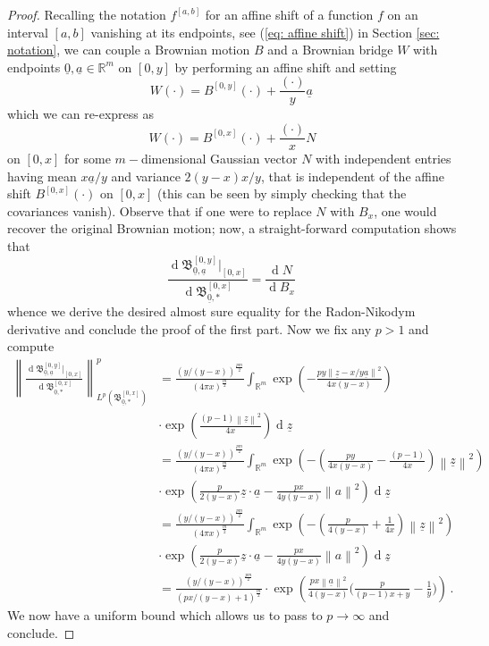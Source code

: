 \documentclass[11pt, reqno]{amsart}
\numberwithin{equation}{section}
\newcommand{\R}{\ensuremath{\mathbb{R}}}
\newcommand{\norm}[1]{\left\lVert#1\right\rVert}
\newcommand{\diff}{\ensuremath{\operatorname{d}\!}}
\begin{document}
\begin{proof}
    Recalling the notation $f^{[a,b]}$  for an affine shift of a function $f$ on an interval $[a,b]$ vanishing at its endpoints, see (\ref{eq: affine shift}) in Section \ref{sec: notation}, we can couple a Brownian motion $B$  and a Brownian bridge $W$ with endpoints $\underline{0}, \underline{a}\in \R^m$ on $[0,y]$ by performing an affine shift and setting
    $$
    W(\cdot) = B^{[0, y]}(\cdot)+\frac{(\cdot)}{y}\underline{a}\,
    $$
    which we can re-express as 
    $$
    W(\cdot) = B^{[0, x]}(\cdot)+\frac{(\cdot)}{x}N
    $$
    on $[0, x]$ for some $m-$dimensional Gaussian vector $N$ with independent entries having mean $x\underline{a}/y$ and variance $2(y-x)x/y$, that is independent of the affine shift $B^{[0, x]}(\cdot)$ on $[0,x]$ (this can be seen by simply checking that the covariances vanish). Observe that if one were to replace $N$ with $B_x$, one would recover the original Brownian motion; now, a straight-forward computation shows that
    \begin{equation*}
        \frac{\diff\mathfrak{B}^{[0, y]}_{\underline{0}, \underline{a}}|_{[0,x]}}{\diff\mathfrak{B}^{[0, x]}_{\underline{0}, *}} = \frac{\diff N}{\diff B_x}\,
    \end{equation*}
    whence we derive the desired almost sure equality for the Radon-Nikodym derivative and conclude the proof of the first part. Now we fix any $p>1$ and compute
    \begin{align*}
            \norm{\frac{\diff\mathfrak{B}^{[0, y]}_{\underline{0}, \underline{a}}|_{[0,x]}}{\diff\mathfrak{B}^{[0, x]}_{\underline{0}, *}}}^p_{L^p\left(\mathfrak{B}^{[0, x]}_{\underline{0}, *}\right)} & = \frac{(y/(y-x))^{\frac{pm}{2}}}{(4\pi x)^{\frac{m}{2}}}\displaystyle\int_{\R^m}\exp\left(-\frac{py\norm{\underline{z}-x/y\underline{a}}^2}{4x(y-x)}\right)\\
            & \cdot \exp\left(\frac{(p-1)\norm{\underline{z}}^2}{4x}\right)\diff \underline{z} \\
            &= \frac{(y/(y-x))^{\frac{pm}{2}}}{(4\pi x)^{\frac{m}{2}}}\displaystyle\int_{\R^m}\exp\left(-\left(\frac{py}{4x(y-x)}-\frac{(p-1)}{4x}\right)\norm{\underline{z}}^2\right) \\
            &\cdot  \exp\left(\frac{p}{2(y-x)}\underline{z}\cdot \underline{a}-\frac{px}{4y(y-x)}\norm{a}^2\right)\diff\underline{z}\\
            &= \frac{(y/(y-x))^{\frac{pm}{2}}}{(4\pi x)^{\frac{m}{2}}}\displaystyle\int_{\R^m}\exp\left(-\left(\frac{p}{4(y-x)}+\frac{1}{4x}\right)\norm{\underline{z}}^2\right) \\
            &\cdot  \exp\left(\frac{p}{2(y-x)}\underline{z}\cdot \underline{a}-\frac{px}{4y(y-x)}\norm{a}^2\right)\diff\underline{z}\\
             &= \frac{(y/(y-x))^{\frac{pm}{2}}}{(px/(y-x)+1)^{\frac{m}{2}}}\cdot \exp\left({\frac{px\norm{\underline{a}}^2}{4(y-x)}\big(\frac{p}{(p-1)x+y}-\frac{1}{y}\big)}\right)\,.
    \end{align*}
    We now have a uniform bound which allows us to pass to $p\to \infty$ and conclude.
\end{proof}
\end{document}
